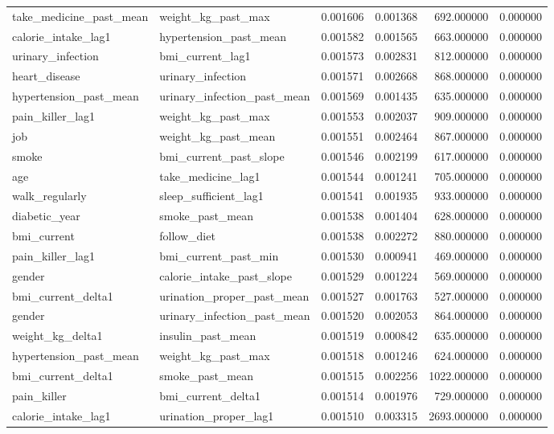 \begin{longtable}{llrrrr}
take\_medicine\_past\_mean & weight\_kg\_past\_max & 0.001606 & 0.001368 & 692.000000 & 0.000000 \\
calorie\_intake\_lag1 & hypertension\_past\_mean & 0.001582 & 0.001565 & 663.000000 & 0.000000 \\
urinary\_infection & bmi\_current\_lag1 & 0.001573 & 0.002831 & 812.000000 & 0.000000 \\
heart\_disease & urinary\_infection & 0.001571 & 0.002668 & 868.000000 & 0.000000 \\
hypertension\_past\_mean & urinary\_infection\_past\_mean & 0.001569 & 0.001435 & 635.000000 & 0.000000 \\
pain\_killer\_lag1 & weight\_kg\_past\_max & 0.001553 & 0.002037 & 909.000000 & 0.000000 \\
job & weight\_kg\_past\_mean & 0.001551 & 0.002464 & 867.000000 & 0.000000 \\
smoke & bmi\_current\_past\_slope & 0.001546 & 0.002199 & 617.000000 & 0.000000 \\
age & take\_medicine\_lag1 & 0.001544 & 0.001241 & 705.000000 & 0.000000 \\
walk\_regularly & sleep\_sufficient\_lag1 & 0.001541 & 0.001935 & 933.000000 & 0.000000 \\
diabetic\_year & smoke\_past\_mean & 0.001538 & 0.001404 & 628.000000 & 0.000000 \\
bmi\_current & follow\_diet & 0.001538 & 0.002272 & 880.000000 & 0.000000 \\
pain\_killer\_lag1 & bmi\_current\_past\_min & 0.001530 & 0.000941 & 469.000000 & 0.000000 \\
gender & calorie\_intake\_past\_slope & 0.001529 & 0.001224 & 569.000000 & 0.000000 \\
bmi\_current\_delta1 & urination\_proper\_past\_mean & 0.001527 & 0.001763 & 527.000000 & 0.000000 \\
gender & urinary\_infection\_past\_mean & 0.001520 & 0.002053 & 864.000000 & 0.000000 \\
weight\_kg\_delta1 & insulin\_past\_mean & 0.001519 & 0.000842 & 635.000000 & 0.000000 \\
hypertension\_past\_mean & weight\_kg\_past\_max & 0.001518 & 0.001246 & 624.000000 & 0.000000 \\
bmi\_current\_delta1 & smoke\_past\_mean & 0.001515 & 0.002256 & 1022.000000 & 0.000000 \\
pain\_killer & bmi\_current\_delta1 & 0.001514 & 0.001976 & 729.000000 & 0.000000 \\
calorie\_intake\_lag1 & urination\_proper\_lag1 & 0.001510 & 0.003315 & 2693.000000 & 0.000000 \\

\end{longtable}
